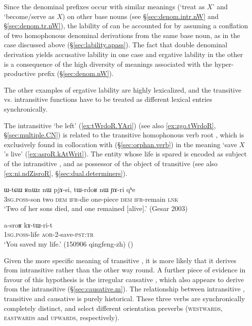 Since the  denominal prefixes occur with similar  meanings (`treat as $X$' and `become/serve as $X$) on other base nouns (see §\ref{sec:denom.intr.nW} and §\ref{sec:denom.tr.nW}), the lability of  can be accounted for by assuming a conflation of two homophonous denominal derivations from the same base noun, as in the case   discussed above (§\ref{sec:lability.apass}). The fact that double denominal derivation yields accusative lability in one case and ergative lability in the other is a consequence of the high diversity of meanings associated with the hyper-productive  prefix (§\ref{sec:denom.nW}).

The other examples of ergative lability are highly lexicalized, and the transitive vs. intransitive functions have to be treated as different lexical entries synchronically.

The intransitive  `be left' (\ref{ex:tWrdoR.YAri}) (see also \ref{ex:zgo.tWrdoR}, §\ref{sec:multiple.CN}) is related to the transitive homophonous verb root , which is exclusively found in collocation with  (§\ref{sec:orphan.verb}) in the meaning `save $X$'s live' (\ref{ex:asroR.kAtWrit}). The entity whose life is spared is encoded as subject of the intransitive , and as possessor of the object  of transitive  (see also \ref{ex:ni.ndZisroR}, §\ref{sec:dual.determiners}).

\begin{exe}
\ex \label{ex:tWrdoR.YAri}
 \gll  ɯ-tɕɯ ʁnɯz nɯ pjɤ-si, tɯ-rdoʁ nɯ ɲɤ-ri qʰe \\
 \textsc{3sg}.\textsc{poss}-son two \textsc{dem} \textsc{ifr}-die one-piece \textsc{dem} \textsc{ifr}-remain \textsc{lnk} \\
\glt `Two of her sons died, and one remained [alive].' (Gesar 2003)
\end{exe}

\begin{exe}
\ex \label{ex:asroR.kAtWrit}
 \gll a-sroʁ kɤ-tɯ-ri-t \\
\textsc{1sg}.\textsc{poss}-life \textsc{aor}-2-save-\textsc{pst}:\textsc{tr} \\
\glt `You saved my life.' (150906 qingfeng-zh) ()
\end{exe}

Given the more specific meaning of transitive , it is more likely that it derives from intransitive  rather than the other way round. A further piece of evidence in favour of this hypothesis is the irregular causative , which also appears to derive from the intransitive  (§\ref{sec:causative.m}). The relationship between intransitive , transitive  and causative  is purely historical. These three verbs are synchronically completely distinct, and select different orientation preverbs (\textsc{westwards},  \textsc{eastwards} and  \textsc{upwards}, respectively).
 
